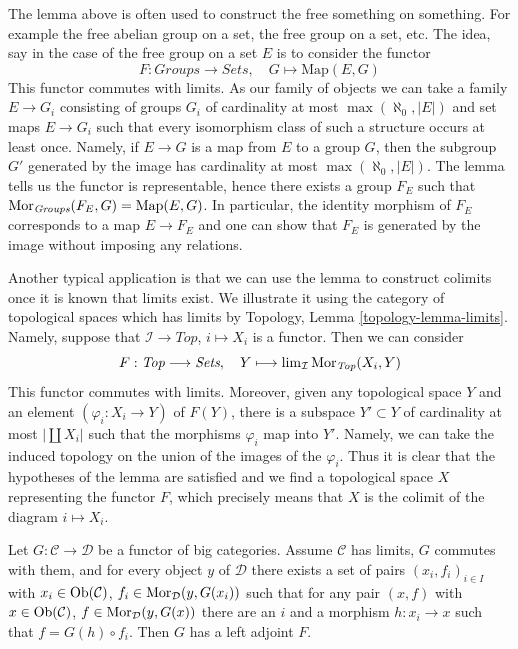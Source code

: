 \begin{remark}
\label{remark-how-to-use-it}
The lemma above is often used to construct the free something on something.
For example the free abelian group on a set, the free group on a set, etc.
The idea, say in the case of the free group on a set $E$ is to
consider the functor
$$
F : \textit{Groups} \to \textit{Sets},\quad
G \longmapsto \text{Map}(E, G)
$$
This functor commutes with limits. As our family of objects
we can take a family $E \to G_i$ consisting of groups $G_i$
of cardinality at most $\max(\aleph_0, |E|)$ and set maps
$E \to G_i$ such that every isomorphism class of such a structure
occurs at least once. Namely, if $E \to G$ is a map from $E$ to
a group $G$, then the subgroup $G'$ generated by the image has
cardinality at most $\max(\aleph_0, |E|)$. The lemma tells us
the functor is representable, hence there exists a group
$F_E$ such that $\mathop{\mathrm{Mor}}\nolimits_{\textit{Groups}}(F_E, G) = \text{Map}(E, G)$.
In particular, the identity morphism of $F_E$ corresponds to
a map $E \to F_E$ and one can show that $F_E$ is generated by
the image without imposing any relations.

\medskip\noindent
Another typical application is that we can use the lemma to construct
colimits once it is known that limits exist. We illustrate it using
the category of topological spaces which has limits by
Topology, Lemma \ref{topology-lemma-limits}. Namely, suppose
that $\mathcal{I} \to \textit{Top}$, $i \mapsto X_i$ is a functor.
Then we can consider
$$
F : \textit{Top} \longrightarrow \textit{Sets},\quad
Y \longmapsto \mathop{\mathrm{lim}}\nolimits_\mathcal{I} \mathop{\mathrm{Mor}}\nolimits_{\textit{Top}}(X_i, Y)
$$
This functor commutes with limits. Moreover, given any topological space
$Y$ and an element $(\varphi_i : X_i \to Y)$ of $F(Y)$, there is
a subspace $Y' \subset Y$ of cardinality at most $|\coprod X_i|$
such that the morphisms $\varphi_i$ map into $Y'$. Namely, we can
take the induced topology on the union of the images of the $\varphi_i$.
Thus it is clear that the hypotheses of the lemma are satisfied and we find a
topological space $X$
representing the functor $F$, which precisely means that $X$ is
the colimit of the diagram $i \mapsto X_i$.
\end{remark}

\begin{theorem}
\label{theorem-adjoint-functor}
Let $G : \mathcal{C} \to \mathcal{D}$ be a functor of big categories.
Assume $\mathcal{C}$ has limits, $G$ commutes with them, and for
every object $y$ of $\mathcal{D}$ there exists a set of pairs
$(x_i, f_i)_{i \in I}$ with $x_i \in \mathop{\mathrm{Ob}}\nolimits(\mathcal{C})$,
$f_i \in \mathop{\mathrm{Mor}}\nolimits_\mathcal{D}(y, G(x_i))$ such that for any
pair $(x, f)$ with $x \in \mathop{\mathrm{Ob}}\nolimits(\mathcal{C})$,
$f \in \mathop{\mathrm{Mor}}\nolimits_\mathcal{D}(y, G(x))$ there are an $i$ and a morphism
$h : x_i \to x$ such that $f = G(h) \circ f_i$.
Then $G$ has a left adjoint $F$.
\end{theorem}

